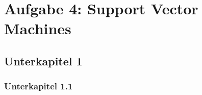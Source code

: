 \pagebreak
\section{Aufgabe 4: Support Vector Machines}
\subsection{Unterkapitel 1}
\subsubsection{Unterkapitel 1.1}